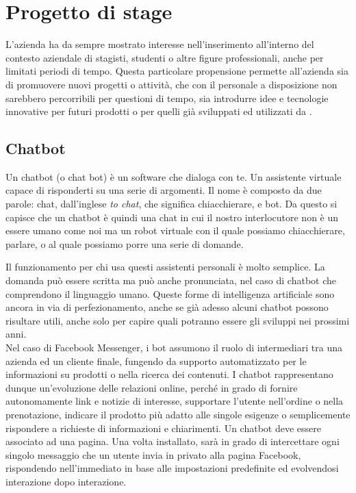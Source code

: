 
\chapter{Progetto di stage}
\label{cap:progetto-stage}

L'azienda \azienda{} ha da sempre mostrato interesse nell'inserimento all'interno del contesto aziendale di stagisti, studenti o altre figure professionali, anche per limitati periodi di tempo. Questa particolare propensione permette all'azienda sia di promuovere nuovi progetti o attività, che con il personale a disposizione non sarebbero percorribili per questioni di tempo, sia introdurre idee e tecnologie innovative per futuri prodotti o per quelli già sviluppati ed utilizzati da \azienda{}.\\ 

\section{Chatbot}
Un \gls{chatbot} (o chat bot) è un software che dialoga con te. Un assistente virtuale capace di risponderti su una serie di argomenti. Il nome è composto da due parole: chat, dall’inglese \emph{to chat}, che significa chiacchierare, e bot. Da questo si capisce che un \gls{chatbot} è quindi una chat in cui il nostro interlocutore non è un essere umano come noi ma un robot virtuale con il quale possiamo chiacchierare, parlare, o al quale possiamo porre una serie di domande.

Il funzionamento per chi usa questi assistenti personali è molto semplice. La domanda può essere scritta ma può anche pronunciata, nel caso di \gls{chatbot} che comprendono il linguaggio umano. Queste forme di intelligenza artificiale sono ancora in via di perfezionamento, anche se già adesso alcuni \gls{chatbot} possono risultare utili, anche solo per capire quali potranno essere gli sviluppi nei prossimi anni.\\
Nel caso di Facebook Messenger, i bot assumono il ruolo di intermediari tra una azienda ed un cliente finale, fungendo da supporto automatizzato per le informazioni su prodotti o nella ricerca dei contenuti. I \gls{chatbot} rappresentano dunque un’evoluzione delle relazioni online, perché in grado di fornire autonomamente link e notizie di interesse, supportare l’utente nell’ordine o nella prenotazione, indicare il prodotto più adatto alle singole esigenze o semplicemente rispondere a richieste di informazioni e chiarimenti. 
Un \gls{chatbot} deve essere associato ad una pagina. Una volta installato, sarà in grado di intercettare ogni singolo messaggio che un utente invia in privato alla pagina Facebook, rispondendo nell’immediato in base alle impostazioni predefinite ed evolvendosi interazione dopo interazione.

